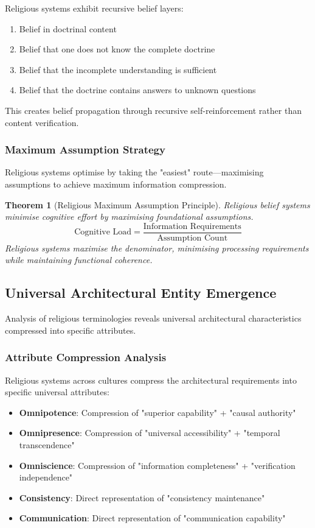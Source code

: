 \documentclass[12pt,a4paper]{article}
\newtheorem{theorem}{Theorem}
\begin{document}
\begin{observation}
Religious systems exhibit recursive belief layers:
\begin{enumerate}
\item Belief in doctrinal content
\item Belief that one does not know the complete doctrine
\item Belief that the incomplete understanding is sufficient
\item Belief that the doctrine contains answers to unknown questions
\end{enumerate}
This creates belief propagation through recursive self-reinforcement rather than content verification.
\end{observation}

\subsubsection{Maximum Assumption Strategy}

Religious systems optimise by taking the "easiest" route—maximising assumptions to achieve maximum information compression.

\begin{theorem}[Religious Maximum Assumption Principle]
Religious belief systems minimise cognitive effort by maximising foundational assumptions.
$$\text{Cognitive Load} = \frac{\text{Information Requirements}}{\text{Assumption Count}}$$
Religious systems maximise the denominator, minimising processing requirements while maintaining functional coherence.
\end{theorem}

\subsection{Universal Architectural Entity Emergence}

Analysis of religious terminologies reveals universal architectural characteristics compressed into specific attributes.

\subsubsection{Attribute Compression Analysis}

Religious systems across cultures compress the architectural requirements into specific universal attributes:

\begin{itemize}
\item \textbf{Omnipotence}: Compression of "superior capability" + "causal authority"
\item \textbf{Omnipresence}: Compression of "universal accessibility" + "temporal transcendence"  
\item \textbf{Omniscience}: Compression of "information completeness" + "verification independence"
\item \textbf{Consistency}: Direct representation of "consistency maintenance"
\item \textbf{Communication}: Direct representation of "communication capability"
\end{itemize}
\end{document}
